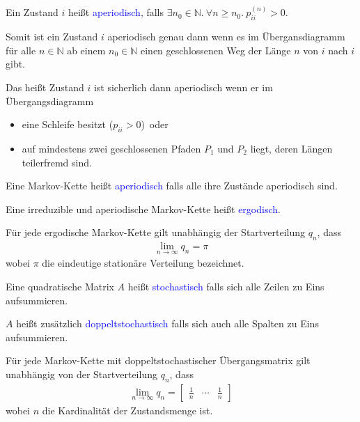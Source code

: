 \documentclass{beamer}
\def\padding{\vspace{0.5cm}}
\def\spadding{\vspace{0.25cm}}
\def\b{\textcolor{blue}}
\begin{document}
\begin{frame}
    \begin{definition}
        Ein Zustand $i$ heißt \b{aperiodisch}, falls $\exists n_0 \in \mathbb{N}.\ \forall n \geq n_0.\ p_{ii}^{(n)} > 0$.\pause\par\spadding
        Somit ist ein Zustand $i$ aperiodisch genau dann wenn es im Übergansdiagramm für alle $n \in \mathbb{N}$ ab einem $n_0 \in \mathbb{N}$ einen geschlossenen Weg der Länge $n$ von $i$ nach $i$ gibt.\pause\par\spadding
        Das heißt Zustand $i$ ist sicherlich dann aperiodisch wenn er im Übergangsdiagramm
        \begin{itemize}
            \item eine Schleife besitzt ($p_{ii} > 0$)\pause\ oder
            \item auf mindestens zwei geschlossenen Pfaden $P_1$ und $P_2$ liegt, deren Längen teilerfremd sind.
        \end{itemize}\pause\par\padding
        Eine Markov-Kette heißt \b{aperiodisch} falls alle ihre Zustände aperiodisch sind.
    \end{definition}
\end{frame}

\begin{frame}
    \begin{definition}
        Eine irreduzible und aperiodische Markov-Kette heißt \b{ergodisch}.
    \end{definition}\pause\par\padding
    Für jede ergodische Markov-Kette gilt unabhängig der Startverteilung $q_n$, dass
    \begin{align*}
        \lim_{n \to \infty} q_n = \pi
    \end{align*}
    wobei $\pi$ die eindeutige stationäre Verteilung bezeichnet.
\end{frame}

\begin{frame}
    \begin{definition}
        Eine quadratische Matrix $A$ heißt \b{stochastisch} falls sich alle Zeilen zu Eins aufsummieren.\pause\par\spadding
        $A$ heißt zusätzlich \b{doppeltstochastisch} falls sich auch alle Spalten zu Eins aufsummieren.
    \end{definition}\pause\par\padding
    Für jede Markov-Kette mit doppeltstochastischer Übergangsmatrix gilt unabhängig von der Startverteilung $q_n$, dass
    \begin{align*}
        \lim_{n \to \infty} q_n = \begin{bmatrix}
            \frac{1}{n} & \cdots & \frac{1}{n}
        \end{bmatrix}
    \end{align*}
    wobei $n$ die Kardinalität der Zustandsmenge ist.
\end{frame}
\end{document}
